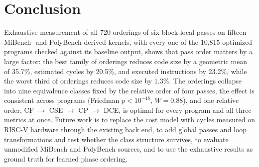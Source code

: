 \documentclass[conference]{IEEEtran}
\begin{document}
\section{Conclusion}
Exhaustive measurement of all 720 orderings of six block-local passes on fifteen MiBench- and PolyBench-derived kernels, with every one of the 10,815 optimized programs checked against its baseline output, shows that pass order matters by a large factor: the best family of orderings reduces code size by a geometric mean of 35.7\%, estimated cycles by 20.5\%, and executed instructions by 23.2\%, while the worst third of orderings reduces code size by 1.3\%. The orderings collapse into nine equivalence classes fixed by the relative order of four passes, the effect is consistent across programs (Friedman $p < 10^{-48}$, $W = 0.88$), and one relative order, CF $\to$ CSE $\to$ CP $\to$ DCE, is optimal for every program and all three metrics at once. Future work is to replace the cost model with cycles measured on RISC-V hardware through the existing back end, to add global passes and loop transformations and test whether the class structure survives, to evaluate unmodified MiBench and PolyBench sources, and to use the exhaustive results as ground truth for learned phase ordering.
\end{document}
